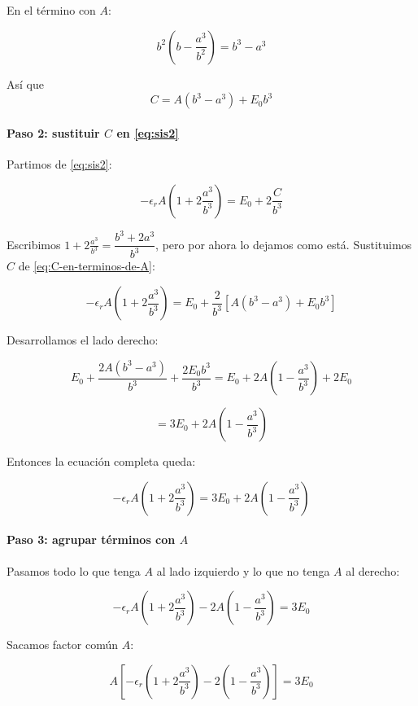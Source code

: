 \documentclass{article}
\begin{document}
En el término con $A$:

\[
b^{2}\left(b - \frac{a^{3}}{b^{2}}\right)
= b^{3} - a^{3}
\]

Así que
\begin{equation}
C = A(b^{3} - a^{3}) + E_{0}b^{3}
\label{eq:C-en-terminos-de-A}
\end{equation}

\paragraph{Paso 2: sustituir $C$ en \eqref{eq:sis2}}

Partimos de \eqref{eq:sis2}:

\[
-\epsilon_{r}A\left(1 + 2\frac{a^{3}}{b^{3}}\right)
= E_{0} + 2\frac{C}{b^{3}}
\]

Escribimos $1 + 2\frac{a^{3}}{b^{3}} = \dfrac{b^{3} + 2a^{3}}{b^{3}}$, pero por ahora lo dejamos como está.  
Sustituimos $C$ de \eqref{eq:C-en-terminos-de-A}:

\[
-\epsilon_{r}A\left(1 + 2\frac{a^{3}}{b^{3}}\right)
= E_{0} + \frac{2}{b^{3}}\left[A(b^{3} - a^{3}) + E_{0}b^{3}\right]
\]

Desarrollamos el lado derecho:

\[
E_{0} + \frac{2A(b^{3} - a^{3})}{b^{3}} + \frac{2E_{0}b^{3}}{b^{3}}
= E_{0} + 2A\left(1 - \frac{a^{3}}{b^{3}}\right) + 2E_{0}
\]

\[
= 3E_{0} + 2A\left(1 - \frac{a^{3}}{b^{3}}\right)
\]

Entonces la ecuación completa queda:

\begin{equation}
-\epsilon_{r}A\left(1 + 2\frac{a^{3}}{b^{3}}\right)
= 3E_{0} + 2A\left(1 - \frac{a^{3}}{b^{3}}\right)
\label{eq:A-ecuacion-intermedia}
\end{equation}

\paragraph{Paso 3: agrupar términos con $A$}

Pasamos todo lo que tenga $A$ al lado izquierdo y lo que no tenga $A$ al derecho:

\[
-\epsilon_{r}A\left(1 + 2\frac{a^{3}}{b^{3}}\right)
- 2A\left(1 - \frac{a^{3}}{b^{3}}\right)
= 3E_{0}
\]

Sacamos factor común $A$:

\[
A\left[
-\epsilon_{r}\left(1 + 2\frac{a^{3}}{b^{3}}\right)
- 2\left(1 - \frac{a^{3}}{b^{3}}\right)
\right] = 3E_{0}
\]
\end{document}

